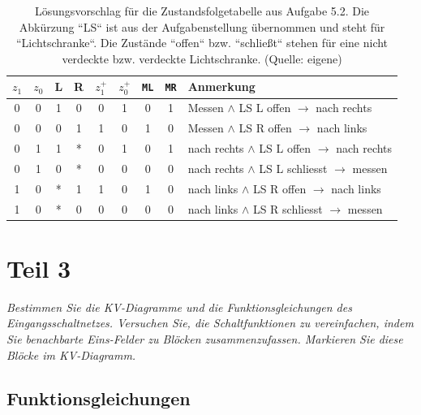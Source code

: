 \begin{table}[h!]
    \centering
    \setlength{\tabcolsep}{0.5em}
    \def\arraystretch{1.5}
    \begin{tabular}{|c|c|c|c||c|c||c|c||l|}
        \hline
        \textbf{$z_1$} & \textbf{$z_0$} & \textbf{L} & \textbf{R} & \textbf{$z_1^+$} & \textbf{$z_0^+$} & \texttt{ML} & \texttt{MR} & Anmerkung \\
        \hline
        \hline
        0 & 0 & 1 & 0 & 0 & 1 & 0 & 1 & Messen $\land$ LS L offen $\rightarrow$ nach rechts\\ \hline
        0 & 0 & 0 & 1 & 1 & 0 & 1 & 0 & Messen $\land$ LS R offen $\rightarrow$ nach links \\ \hline
        \hline
        0 & 1 & 1 & * & 0 & 1 & 0 & 1 & nach rechts $\land$ LS L offen $\rightarrow$ nach rechts \\ \hline
        0 & 1 & 0 & * & 0 & 0 & 0 & 0 & nach rechts $\land$ LS L schliesst $\rightarrow$ messen \\ \hline
        \hline
        1 & 0 & * & 1 & 1 & 0 & 1 & 0 &  nach links $\land$ LS R offen $\rightarrow$ nach links \\ \hline
        1 & 0 & * & 0 & 0 & 0 & 0 & 0 &  nach links $\land$ LS R schliesst $\rightarrow$ messen \\
        \hline
    \end{tabular}
    \caption{Lösungsvorschlag für die Zustandsfolgetabelle aus Aufgabe 5.2. Die Abkürzung ``LS`` ist aus der Aufgabenstellung übernommen und steht für ``Lichtschranke``. Die Zustände ``offen`` bzw. ``schließt`` stehen für eine nicht verdeckte bzw. verdeckte Lichtschranke. (Quelle: eigene)}
    \label{tab:zustandsfolgetabelle}
\end{table}


\section{Teil 3}

\textit{Bestimmen Sie die KV-Diagramme und die Funktionsgleichungen des
Eingangsschaltnetzes.
Versuchen Sie, die Schaltfunktionen zu vereinfachen, indem Sie benachbarte Eins-Felder zu Blöcken zusammenzufassen. Markieren Sie diese
Blöcke im KV-Diagramm.}\\

\noindent
\subsection*{Funktionsgleichungen}

